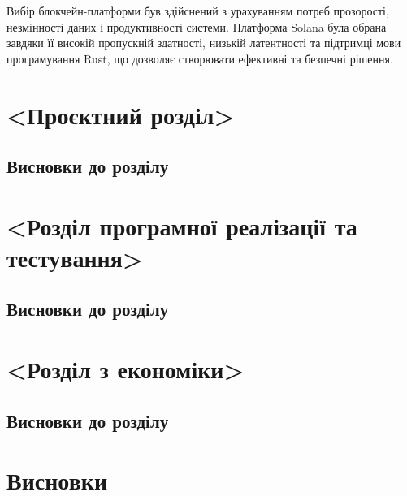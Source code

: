 \documentclass[14pt]{extreport}
\begin{document}
  Вибір блокчейн-платформи був здійснений з урахуванням потреб прозорості, незмінності даних і продуктивності системи. Платформа Solana була обрана завдяки її високій пропускній здатності, низькій латентності та підтримці мови програмування Rust, що дозволяє створювати ефективні та безпечні рішення.

  \chapter{<Проєктний розділ>}

  \section{}
  \section{Висновки до розділу}
  
  \chapter{<Розділ програмної реалізації та тестування>}
  
  \section{}
  \section{Висновки до розділу}
  
  \chapter{<Розділ з економіки>}
  
  \section{}
  \section{Висновки до розділу}
  
  \chapter*{Висновки}
  
\end{document}
